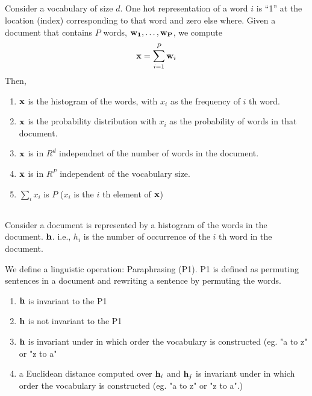 \begin{frame}
\section{}
  Consider a vocabulary of size $d$. One hot representation of a word $i$ is ``1'' at the location
  (index) corresponding to that word and zero else where.
  Given a document that contains $P$ words,  ${\bf w_1, \ldots, w_P}$, we compute
  \[ {\bf x} = \sum_{i=1}^P {\bf w}_i \]
  Then,
    \begin{enumerate}[label=(\Alph*)]
      \item ${\bf x}$ is the histogram of the words, with $x_i$ as the frequency of $i$ th word. %
      \item ${\bf x}$ is the probability distribution with $x_i$ as the probability of words in that document.
      \item ${\bf x}$ is in $R^d$ independnet of the number of words in the document. %
      \item ${\bf x}$ is in $R^P$ independent of the vocabulary size.
      \item $\sum_{i} {x}_i$ is $P$ ($x_i$ is the $i$ th element of ${\bf x}$) %
    \end{enumerate}
\end{frame}

\begin{frame}
\section{}
  Consider a document is represented by a histogram of the words in the document. ${\bf h}$. i.e., $h_i$ is the
  number of occurrence of the $i$ th word in the document.

  We define a linguistic operation: Paraphrasing (P1). P1 is defined as permuting sentences in a document and rewriting a sentence by permuting the words.
     \begin{enumerate}[label=(\Alph*)]
        \item ${\bf h}$ is invariant to the P1 %
        \item ${\bf h}$ is not invariant to the P1
        \item ${\bf h}$ is invariant under in which order the vocabulary is constructed (eg. "a to z" or "z to a"
        \item a Euclidean distance computed over ${\bf h}_i$ and ${\bf h}_j$ is invariant under in which order the vocabulary is constructed (eg. "a to z" or "z to a".)
     \end{enumerate}
\end{frame}

